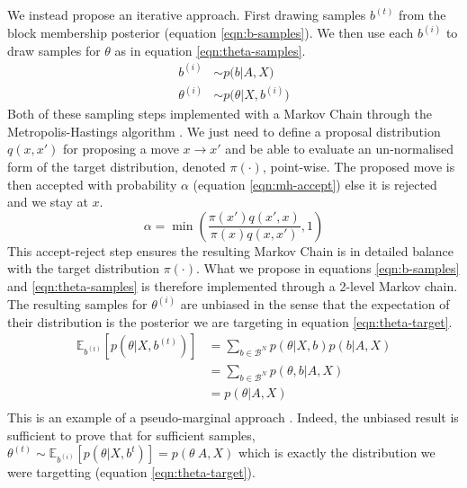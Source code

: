 \documentclass{article}
\newcommand{\Expect}{\mathbb{E}}
\begin{document}
We instead propose an iterative approach. First drawing samples $b^{(t)}$ from the block membership posterior (equation \ref{eqn:b-samples}). We then use each $b^{(i)}$ to draw samples for $\theta$ as in equation \ref{eqn:theta-samples}. 
%
\begin{align}
	b^{(i)} &\sim p \Big( b | A, X \Big)  \label{eqn:b-samples}\\
	\theta^{(i)} &\sim p\Big(\theta | X, b^{(i)} \Big) \label{eqn:theta-samples}
\end{align}
%
Both of these sampling steps implemented with a Markov Chain through the Metropolis-Hastings algorithm \cite{hastings-alg}. We just need to define a proposal distribution $q(x, x')$ for proposing a move $x \rightarrow x'$ and be able to evaluate an un-normalised form of the target distribution, denoted $\pi(\cdot)$, point-wise. The proposed move is then accepted with probability $\alpha$ (equation \ref{eqn:mh-accept}) else it is rejected and we stay at $x$.
%
\begin{equation}
	\alpha = \min \left( \frac{\pi(x') q(x', x)}{\pi(x) q(x, x')} , 1 \right)
	\label{eqn:mh-accept}
\end{equation}
%
This accept-reject step ensures the resulting Markov Chain is in detailed balance with the target distribution $\pi(\cdot)$. What we propose in equations \ref{eqn:b-samples} and \ref{eqn:theta-samples} is therefore implemented through a 2-level Markov chain. The resulting samples for $\theta^{(i)}$ are unbiased in the sense that the expectation of their distribution is the posterior we are targeting in equation \ref{eqn:theta-target}.
%
\begin{align*}
	\Expect_{b^{(t)}} \left[p \left( \theta | X, b^{(t)} \right) \right] &= \sum_{b \in \mathcal{B}^N} p(\theta | X, b) p(b | A, X) \\
	&= \sum_{b \in \mathcal{B}^N} p(\theta, b | A, X) \\
	&= p(\theta | A, X) \\
\end{align*}
%
This is an example of a pseudo-marginal approach \cite{pseudo-marginal}. Indeed, the unbiased result is sufficient to prove that for sufficient samples, $\theta^{(t)} \sim \Expect_{b^{(i)}} \left[ p(\theta | X, b^{t})\right] = p(\theta 
\ A, X)$ which is exactly the distribution we were targetting (equation \ref{eqn:theta-target}).
\end{document}

